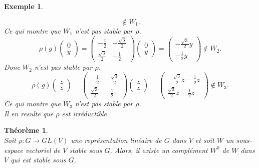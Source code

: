 \documentclass[a4paper, 14pt]{report}
\newtheorem{example}{Exemple}[section]
\newtheorem{theorem}{Théorème}[section]
\begin{document}
\begin{onehalfspace}
{\begin{example}
\begin{enumerate}
\[					\notin W_1.
					\]
					Ce qui montre que \(W_1\) n'est pas stable par \(\rho\).		
					\[
					\rho(g) \begin{pmatrix} 0 \\ y \end{pmatrix} = 
					\begin{pmatrix} -\frac{1}{2} & -\frac{\sqrt{3}}{2} \\ \frac{\sqrt{3}}{2} & -\frac{1}{2} \end{pmatrix} 
					\begin{pmatrix} 0 \\ y \end{pmatrix} = 
					\begin{pmatrix} -\frac{\sqrt{3}}{2}y \\ -\frac{1}{2}y \end{pmatrix}
					\notin W_2.
					\]
					Donc \(W_2\) n'est pas stable par \(\rho\).
					\[
					\rho(g) \begin{pmatrix} z \\ z \end{pmatrix} = 
					\begin{pmatrix} -\frac{1}{2} & -\frac{\sqrt{3}}{2} \\ \frac{\sqrt{3}}{2} & -\frac{1}{2} \end{pmatrix} 
					\begin{pmatrix} z \\ z \end{pmatrix} = 
					\begin{pmatrix} -\frac{\sqrt{3}}{2}z - \frac{1}{2}z \\ \frac{\sqrt{3}}{2}z - \frac{1}{2}z \end{pmatrix}
					\notin W_3.
					\]
					Ce qui montre que \(W_3\) n'est pas stable par \(\rho\).\\
					Il en resulte que \( \rho \) est irréductible.
				\end{enumerate}
			\end{example}
			
			
			\begin{theorem}\cite{serre1971representation} \\
				Soit $\rho : G \to GL(V)$ une représentation linéaire de $G$ dans $V$ et soit 
				$W$ un sous-espace vectoriel de $V$ stable sous $G$. Alors, il existe un complément $W^0$ de $W$ dans $V$ qui est stable sous $G$.\\
			\end{theorem}
			
}
\end{onehalfspace}
\end{document}
